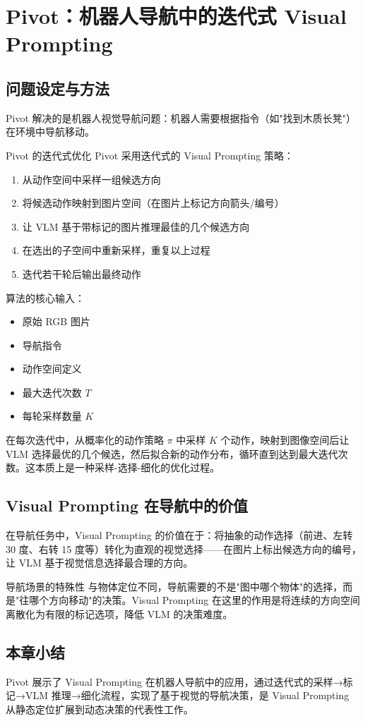 \section{Pivot：机器人导航中的迭代式 Visual Prompting}

\subsection{问题设定与方法}

Pivot 解决的是机器人视觉导航问题：机器人需要根据指令（如"找到木质长凳"）在环境中导航移动。

\begin{importantbox}{Pivot 的迭代式优化}
Pivot 采用迭代式的 Visual Prompting 策略：
\begin{enumerate}
    \item 从动作空间中采样一组候选方向
    \item 将候选动作映射到图片空间（在图片上标记方向箭头/编号）
    \item 让 VLM 基于带标记的图片推理最佳的几个候选方向
    \item 在选出的子空间中重新采样，重复以上过程
    \item 迭代若干轮后输出最终动作
\end{enumerate}
\end{importantbox}

算法的核心输入：
\begin{itemize}
    \item 原始 RGB 图片
    \item 导航指令
    \item 动作空间定义
    \item 最大迭代次数 $T$
    \item 每轮采样数量 $K$
\end{itemize}

在每次迭代中，从概率化的动作策略 $\pi$ 中采样 $K$ 个动作，映射到图像空间后让 VLM 选择最优的几个候选，然后拟合新的动作分布，循环直到达到最大迭代次数。这本质上是一种采样-选择-细化的优化过程。

\subsection{Visual Prompting 在导航中的价值}

在导航任务中，Visual Prompting 的价值在于：将抽象的动作选择（前进、左转 30 度、右转 15 度等）转化为直观的视觉选择——在图片上标出候选方向的编号，让 VLM 基于视觉信息选择最合理的方向。

\begin{warningbox}{导航场景的特殊性}
与物体定位不同，导航需要的不是"图中哪个物体"的选择，而是"往哪个方向移动"的决策。Visual Prompting 在这里的作用是将连续的方向空间离散化为有限的标记选项，降低 VLM 的决策难度。
\end{warningbox}

\subsection{本章小结}

Pivot 展示了 Visual Prompting 在机器人导航中的应用，通过迭代式的采样→标记→VLM 推理→细化流程，实现了基于视觉的导航决策，是 Visual Prompting 从静态定位扩展到动态决策的代表性工作。


